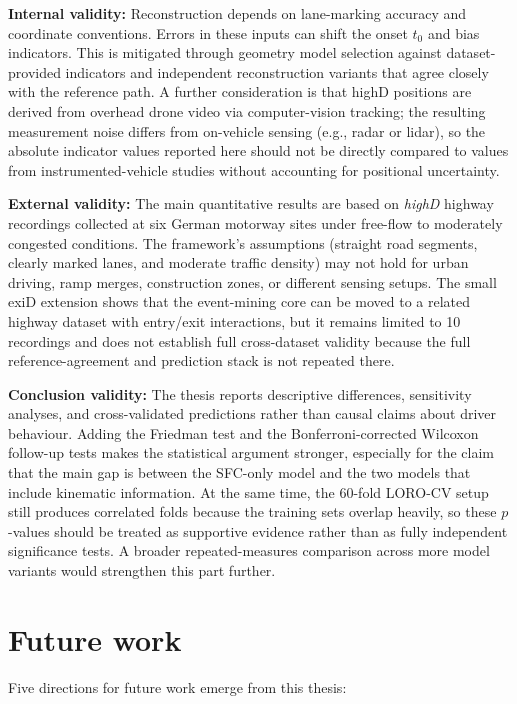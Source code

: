 \documentclass[12pt,a4paper,twoside,openright]{report}
\begin{document}
    \textbf{Internal validity:} Reconstruction depends on lane-marking accuracy and coordinate conventions. Errors in these inputs can shift the onset $t_0$ and bias indicators. This is mitigated through geometry model selection against dataset-provided indicators and independent reconstruction variants that agree closely with the reference path. A further consideration is that highD positions are derived from overhead drone video via computer-vision tracking; the resulting measurement noise differs from on-vehicle sensing (e.g., radar or lidar), so the absolute indicator values reported here should not be directly compared to values from instrumented-vehicle studies without accounting for positional uncertainty.

    \textbf{External validity:} The main quantitative results are based on \textit{highD} highway recordings collected at six German motorway sites under free-flow to moderately congested conditions. The framework's assumptions (straight road segments, clearly marked lanes, and moderate traffic density) may not hold for urban driving, ramp merges, construction zones, or different sensing setups. The small exiD extension shows that the event-mining core can be moved to a related highway dataset with entry/exit interactions, but it remains limited to 10 recordings and does not establish full cross-dataset validity because the full reference-agreement and prediction stack is not repeated there.

    \textbf{Conclusion validity:} The thesis reports descriptive differences, sensitivity analyses, and cross-validated predictions rather than causal claims about driver behaviour. Adding the Friedman test and the Bonferroni-corrected Wilcoxon follow-up tests makes the statistical argument stronger, especially for the claim that the main gap is between the SFC-only model and the two models that include kinematic information. At the same time, the 60-fold LORO-CV setup still produces correlated folds because the training sets overlap heavily, so these $p$-values should be treated as supportive evidence rather than as fully independent significance tests. A broader repeated-measures comparison across more model variants would strengthen this part further.

    \section{Future work}
    Five directions for future work emerge from this thesis:
\end{document}
